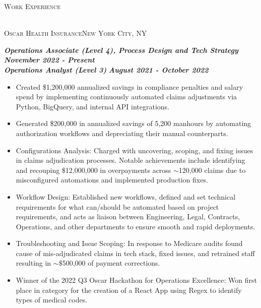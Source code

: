 \documentclass[a4paper]{article}
\newcommand{\lineunder} {
    \vspace*{-8pt} \\
    \hspace*{-18pt} \hrulefill \\
}
\newcommand{\header} [1] {
    {\hspace*{-18pt}\vspace*{6pt} \textsc{#1}}
    \vspace*{-6pt} \lineunder
}
\newcommand{\jobtitle} [1] {
    {\hspace*{-18pt} \textsc{#1}}
    
}
\begin{document}
\header{Work Experience}
\vspace{1mm}
\jobtitle{Oscar Health Insurance\hfill New York City, NY}
\hspace*{-16pt}\textit{\textbf{Operations Associate (Level 4), Process Design and Tech Strategy}} \hfill \textit{\textbf{November 2022 - Present}}\\
\hspace*{-16pt}\textit{\textbf{Operations Analyst (Level 3)}} \hfill \textit{\textbf{August 2021 - October 2022}}\\
\vspace{-1mm}
\begin{itemize}[leftmargin=10pt,align=left]
    \item   Created \$1,200,000 annualized savings in compliance penalties and salary spend by implementing continuously automated claims adjustments 
            via Python, BigQuery, and internal API integrations. 

    \item   Generated \$200,000 in annualized savings of 5,200 manhours by automating authorization workflows and depreciating their manual counterparts.

    \item   Configurations Analysis: Charged with uncovering, scoping, and fixing issues in claims adjudication processes. 
            Notable achievements include identifying and recouping \$12,000,000 in overpayments across
            $\sim$120,000 claims due to misconfigured automations and implemented production fixes.

    \item   Workflow Design: Established new workflows, defined and set technical requirements for what can/should be automated based on project requirements,
     and acts as liaison between Engineering, Legal, Contracts, Operations, and other departments to ensure smooth and rapid deployments.
     
    \item 	Troubleshooting and Issue Scoping: In response to Medicare audits found cause of mis-adjudicated claims in tech stack, fixed issues, and retrained staff
            resulting in $\sim\$$500,000 of payment corrections.

    \item   Winner of the 2022 Q3 Oscar Hackathon for Operations Excellence: Won first place in category for the creation of a React App using Regex to identify types of medical codes.


\end{itemize}
\end{document}
